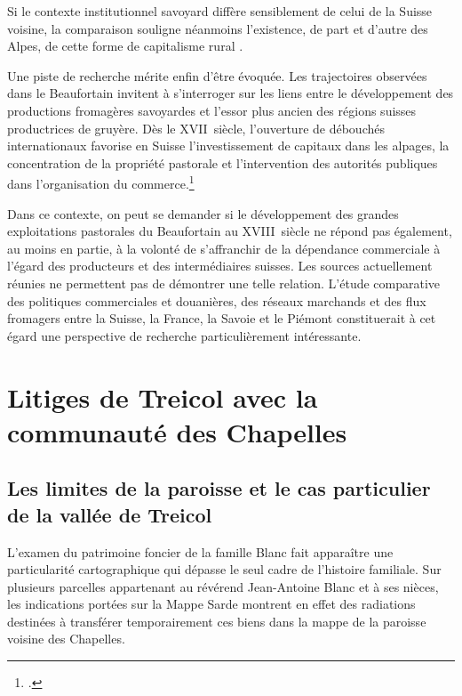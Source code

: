 \documentclass[12pt,a4paper]{report}
\begin{document}
	 Si le contexte institutionnel savoyard diffère sensiblement de celui de la Suisse voisine, la comparaison souligne néanmoins l'existence, de part et d'autre des Alpes, de cette forme de capitalisme rural .
	
	Une piste de recherche mérite enfin d'être évoquée. Les trajectoires observées dans le Beaufortain invitent à s'interroger sur les liens entre le développement des productions fromagères savoyardes et l'essor plus ancien des régions suisses productrices de gruyère. Dès le XVII\ieme\ siècle, l'ouverture de débouchés internationaux favorise en Suisse l'investissement de capitaux dans les alpages, la concentration de la propriété pastorale et l'intervention des autorités publiques dans l'organisation du commerce.\footcite[44, 60, 159]{RuffieuxBodmer1972HistoireGruyere}
	
	Dans ce contexte, on peut se demander si le développement des grandes exploitations pastorales du Beaufortain au XVIII\ieme\ siècle ne répond pas également, au moins en partie, à la volonté de s'affranchir de la dépendance commerciale à l'égard des producteurs et des intermédiaires suisses. Les sources actuellement réunies ne permettent pas de démontrer une telle relation. L'étude comparative des politiques commerciales et douanières, des réseaux marchands et des flux fromagers entre la Suisse, la France, la Savoie et le Piémont constituerait à cet égard une perspective de recherche particulièrement intéressante.
	
\section{Litiges de Treicol avec la communauté des Chapelles }	
\label{sec:LesChappelles}
	
	
	
	\subsection{Les limites de la paroisse et le cas particulier de la vallée de Treicol}
	
	L'examen du patrimoine foncier de la famille Blanc fait apparaître une particularité cartographique qui dépasse le seul cadre de l'histoire familiale. Sur plusieurs parcelles appartenant au révérend Jean-Antoine Blanc et à ses nièces, les indications portées sur la Mappe Sarde montrent en effet des radiations destinées à transférer temporairement ces biens dans la mappe de la paroisse voisine des Chapelles.
	
\end{document}
